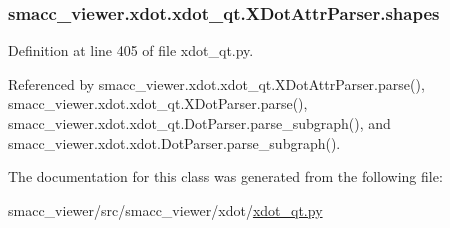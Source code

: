 \subsubsection[{\texorpdfstring{shapes}{shapes}}]{\setlength{\rightskip}{0pt plus 5cm}smacc\+\_\+viewer.\+xdot.\+xdot\+\_\+qt.\+X\+Dot\+Attr\+Parser.\+shapes}\hypertarget{classsmacc__viewer_1_1xdot_1_1xdot__qt_1_1XDotAttrParser_a2cc6b78d7fcae7dddd5f5204b39c1fa3}{}\label{classsmacc__viewer_1_1xdot_1_1xdot__qt_1_1XDotAttrParser_a2cc6b78d7fcae7dddd5f5204b39c1fa3}


Definition at line 405 of file xdot\+\_\+qt.\+py.



Referenced by smacc\+\_\+viewer.\+xdot.\+xdot\+\_\+qt.\+X\+Dot\+Attr\+Parser.\+parse(), smacc\+\_\+viewer.\+xdot.\+xdot\+\_\+qt.\+X\+Dot\+Parser.\+parse(), smacc\+\_\+viewer.\+xdot.\+xdot\+\_\+qt.\+Dot\+Parser.\+parse\+\_\+subgraph(), and smacc\+\_\+viewer.\+xdot.\+xdot.\+Dot\+Parser.\+parse\+\_\+subgraph().



The documentation for this class was generated from the following file\+:\begin{DoxyCompactItemize}
\item 
smacc\+\_\+viewer/src/smacc\+\_\+viewer/xdot/\hyperlink{xdot__qt_8py}{xdot\+\_\+qt.\+py}\end{DoxyCompactItemize}
